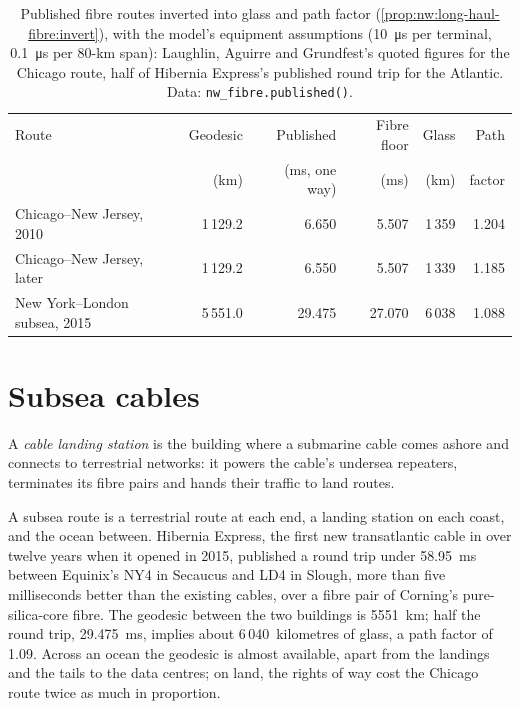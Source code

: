\begin{table}[ht]
\centering\small
\begin{tabular}{lrrrrr}
\toprule
Route & Geodesic & Published & Fibre floor & Glass & Path \\
 & (km) & (ms, one way) & (ms) & (km) & factor \\
\midrule
Chicago--New Jersey, 2010 & 1\,129.2 & 6.650 & 5.507 & 1\,359 & 1.204 \\
Chicago--New Jersey, later & 1\,129.2 & 6.550 & 5.507 & 1\,339 & 1.185 \\
New York--London subsea, 2015 & 5\,551.0 & 29.475 & 27.070 & 6\,038 & 1.088 \\
\bottomrule
\end{tabular}
\caption{Published fibre routes inverted into glass and path factor (\cref{prop:nw:long-haul-fibre:invert}), with the model's equipment
assumptions (\qty{10}{\micro\second} per terminal, \qty{0.1}{\micro\second} per 80-km span): Laughlin, Aguirre and Grundfest's quoted figures
for the Chicago route, half of Hibernia Express's published round trip for the Atlantic. Data: \texttt{nw\_fibre.published()}.}\label{tab:nw:long-haul-fibre:published}
\end{table}

\section{Subsea cables}

\begin{definition}\label{def:nw:long-haul-fibre:cls}
A \emph{cable landing station} is the building where a submarine cable comes ashore and connects to terrestrial
networks: it powers the cable's undersea repeaters, terminates its fibre pairs and hands their traffic to land routes.
\end{definition}

A subsea route is a terrestrial route at each end, a landing station on each coast, and the ocean between. Hibernia Express, the first new
transatlantic cable in over twelve years when it opened in 2015, published a round trip under \qty{58.95}{\milli\second} between Equinix's NY4
in Secaucus and LD4 in Slough, more than five milliseconds better than the existing cables, over a fibre pair of Corning's pure-silica-core
fibre. The geodesic between the two buildings is \qty{5551}{\kilo\metre}; half the round trip, \qty{29.475}{\milli\second}, implies about
6\,040~kilometres of glass, a path factor of 1.09. Across an ocean the geodesic is almost available, apart from the landings and the tails to the
data centres; on land, the rights of way cost the Chicago route twice as much in proportion.

